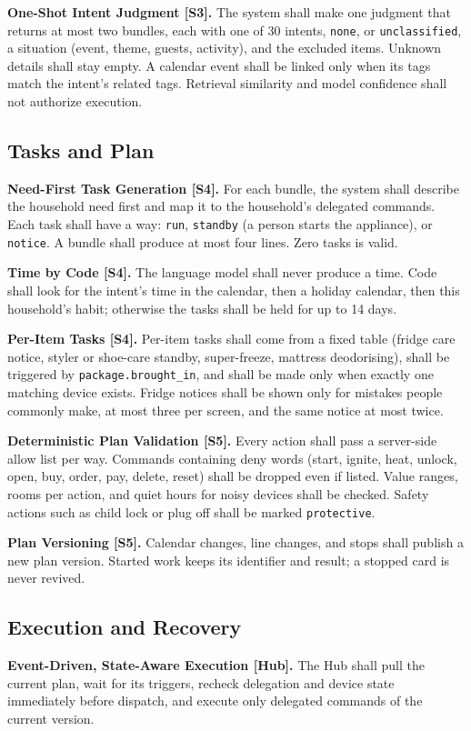 \documentclass[conference]{IEEEtran}
\begin{document}
\textbf{One-Shot Intent Judgment [S3].} The system shall make one judgment that returns at most two bundles, each with one of 30 intents, \texttt{none}, or \texttt{unclassified}, a situation (event, theme, guests, activity), and the excluded items. Unknown details shall stay empty. A calendar event shall be linked only when its tags match the intent's related tags. Retrieval similarity and model confidence shall not authorize execution.

\subsection{Tasks and Plan}
\textbf{Need-First Task Generation [S4].} For each bundle, the system shall describe the household need first and map it to the household's delegated commands. Each task shall have a way: \texttt{run}, \texttt{standby} (a person starts the appliance), or \texttt{notice}. A bundle shall produce at most four lines. Zero tasks is valid.

\textbf{Time by Code [S4].} The language model shall never produce a time. Code shall look for the intent's time in the calendar, then a holiday calendar, then this household's habit; otherwise the tasks shall be held for up to 14 days.

\textbf{Per-Item Tasks [S4].} Per-item tasks shall come from a fixed table (fridge care notice, styler or shoe-care standby, super-freeze, mattress deodorising), shall be triggered by \texttt{package.brought\_in}, and shall be made only when exactly one matching device exists. Fridge notices shall be shown only for mistakes people commonly make, at most three per screen, and the same notice at most twice.

\textbf{Deterministic Plan Validation [S5].} Every action shall pass a server-side allow list per way. Commands containing deny words (start, ignite, heat, unlock, open, buy, order, pay, delete, reset) shall be dropped even if listed. Value ranges, rooms per action, and quiet hours for noisy devices shall be checked. Safety actions such as child lock or plug off shall be marked \texttt{protective}.

\textbf{Plan Versioning [S5].} Calendar changes, line changes, and stops shall publish a new plan version. Started work keeps its identifier and result; a stopped card is never revived.

\subsection{Execution and Recovery}
\textbf{Event-Driven, State-Aware Execution [Hub].} The Hub shall pull the current plan, wait for its triggers, recheck delegation and device state immediately before dispatch, and execute only delegated commands of the current version.
\end{document}
